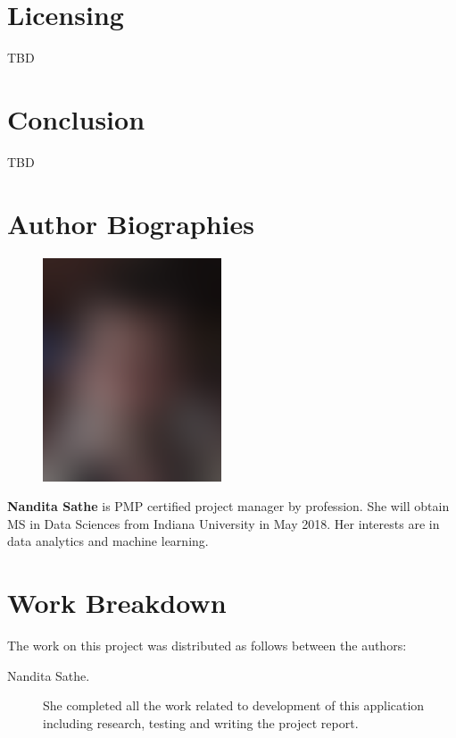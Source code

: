 \documentclass[9pt,twocolumn,twoside]{../../styles/osajnl}
\begin{document}
\section {Licensing}

TBD

\section {Conclusion}

TBD



 
\section*{Author Biographies}
\begingroup
\setlength\intextsep{0pt}
\begin{minipage}[t][3.2cm][t]{1.0\columnwidth} %
  \begin{figure}
    \includegraphics[width=0.25\columnwidth]{images/john_smith.eps}
  \end{figure}
  \noindent
  {\bfseries Nandita Sathe} is PMP certified project manager by profession. She will obtain MS in Data Sciences from Indiana University in May 2018. Her interests are in data analytics and machine learning.
\end{minipage}
\endgroup

\newpage

\section{Work Breakdown}

The work on this project was distributed as follows between the
authors:

\begin{description}

\item[Nandita Sathe.] She completed all the work related to development of this   application including research, testing and writing the project report. 

\end{description}
\end{document}
